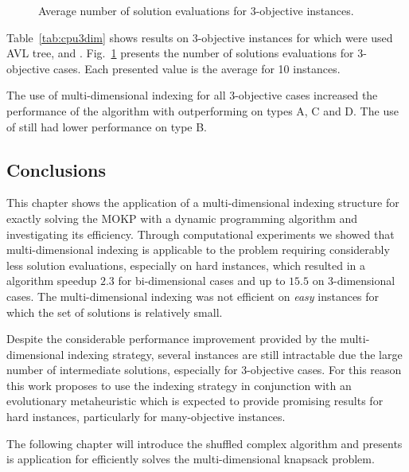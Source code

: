 \begin{figure}[]
  
  \caption{Average number of solution evaluations for 3-objective instances.}
  \label{fig:cmp3dim}
\end{figure}

Table~\ref{tab:cpu3dim} shows results on 3-objective instances for which
were used AVL tree,  and .
Fig.~\ref{fig:cmp3dim} presents the number of solutions evaluations for 3-objective cases.
Each presented value is the average for 10 instances.

The use of multi-dimensional indexing for all 3-objective cases
increased the performance of the algorithm with 
outperforming  on types A, C and D.
The use of \kdtree{} still had lower performance on type B.


\subsection{Conclusions}
This chapter shows the application of a multi-dimensional indexing structure
for exactly solving the MOKP with a dynamic programming algorithm
and investigating its efficiency.
Through computational experiments we showed that multi-dimensional indexing
is applicable to the problem requiring considerably less solution evaluations,
especially on hard instances,
which resulted in a algorithm speedup $2.3$ for bi-dimensional
cases and up to $15.5$ on 3-dimensional cases.
The multi-dimensional indexing was not efficient on \emph{easy} instances
for which the set of solutions is relatively small.

Despite the considerable performance improvement
provided by the multi-dimensional indexing strategy,
several instances are still intractable due 
the large number of intermediate solutions,
especially for 3-objective cases.
For this reason this work proposes to use the indexing strategy
in conjunction with an evolutionary metaheuristic
which is expected to provide
promising results for hard instances,
particularly for many-objective instances.

The following chapter will introduce the shuffled complex algorithm
and presents is application for efficiently solves
the multi-dimensional knapsack problem.